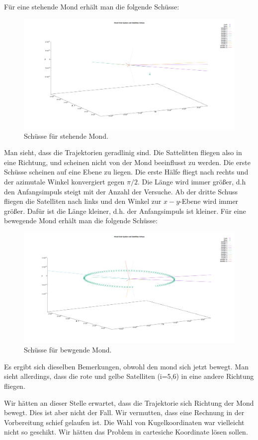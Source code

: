 \documentclass{subfiles}
\begin{document}
    Für eine stehende Mond erhält man die folgende Schüsse:
    \begin{figure}[H]
        \centering
        \includegraphics[width=1\textwidth]{../Ressource/Sat_fixeMond.png}
        \caption{Schüsse für stehende Mond.}
        \label{fig:SatNoMon}
    \end{figure}
    Man sieht, dass die Trajektorien geradlinig sind. Die Sattelitten fliegen also in eine Richtung, und scheinen nicht von der Mond beeinflusst zu werden. 
    Die erste Schüsse scheinen auf eine Ebene zu liegen. Die erste Hälfe fliegt nach rechts und der azimutale Winkel konvergiert gegen $\pi/2$. 
    Die Länge wird immer größer, d.h den Anfangsimpuls steigt mit der Anzahl der Versuche. Ab der dritte Schuss fliegen die Satelliten nach links und den Winkel zur $x-y$-Ebene wird immer größer. Dafür ist die Länge kleiner, d.h. der Anfangsimpuls ist kleiner.  
    Für eine bewegende Mond erhält man die folgende Schüsse:

    \begin{figure}[H]
        \centering
        \includegraphics[width=1\textwidth]{../Ressource/Sat_moveMond.png}
        \caption{Schüsse für bewgende Mond.}
        \label{fig:SatWMon}
    \end{figure}
    Es ergibt sich dieselben Bemerkungen, obwohl den mond sich jetzt bewegt. Man sieht allerdings, dass die rote und gelbe Satelliten (i=5,6) in eine andere Richtung fliegen.\newline

    Wir hätten an dieser Stelle erwartet, dass die Trajektorie sich Richtung der Mond bewegt. Dies ist aber nicht der Fall. 
    Wir vermutten, dass eine Rechnung in der Vorbereitung schief gelaufen ist. Die Wahl von Kugelkoordinaten war vielleicht nicht so geschikt.
    Wir hätten das Problem in cartesiche Koordinate lösen sollen. 
\end{document}
